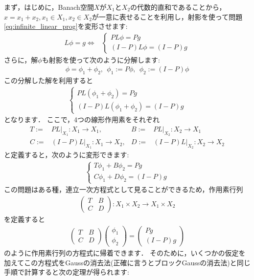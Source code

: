 まず，はじめに，Banach空間$X$が$X_1$と$X_2$の代数的直和であることから，$x = x_1 + x_2, x_1 \in X_1, x_2 \in X_2$が一意に表せることを利用し，射影を使って問題\eqref{eq:infinite_linear_prog}を変形させます:
\begin{align*}
	L \phi = g \Leftrightarrow& \left\{ \begin{array}{l}
		P L \phi = Pg \\
		(I - P) L \phi = (I - P) g
	\end{array}\right.
\end{align*}
さらに，解$\phi$も射影を使って次のように分解します:
\begin{align*}
	\phi = \phi_1 + \phi_2, ~~ \phi_1 := P \phi, ~~ \phi_2 := (I-P) \phi
\end{align*}
この分解した解を利用すると
\begin{align*}
\left\{ \begin{array}{l}
		P L ( \phi_1 + \phi_2 ) = Pg \\
		(I - P) L ( \phi_1 + \phi_2 ) = (I - P) g
	\end{array}\right.
\end{align*}
となります．
ここで，4つの線形作用素をそれぞれ
\begin{align}
	T :=& PL|_{X_1} : X_1 \rightarrow X_1, & B :=& PL|_{X_2}: X_2 \rightarrow X_1 \label{def:TBCD} \\
	C :=& (I - P) L |_{X_1}: X_1 \rightarrow X_2, & D :=& (I - P) L |_{X_2}: X_2 \rightarrow X_2 \nonumber
\end{align}
と定義すると，次のように変形できます:
\begin{align*}
\left\{ \begin{array}{l}
		T \phi_1 + B \phi_2 = Pg \\
		C \phi_1 + D \phi_2 = (I - P) g
	\end{array}\right.
\end{align*}
この問題はある種，連立一次方程式として見ることができるため，作用素行列
\begin{align*}
	\left( \begin{array}{cc}
		T & B \\
		C & D
	\end{array} \right) : X_1 \times X_2 \rightarrow X_1 \times X_2
\end{align*}
を定義すると
\begin{align*}
	\left( \begin{array}{cc}
		T & B \\
		C & D
	\end{array} \right)\left( \begin{array}{c}
		\phi_1 \\
		\phi_2
	\end{array} \right) = \left( \begin{array}{c}
		Pg \\
		(I-P)g
	\end{array} \right)
\end{align*}
のように作用素行列の方程式に帰着できます．
そのために，いくつかの仮定を加えてこの方程式をGaussの消去法(正確に言うとブロックGaussの消去法)と同じ手順で計算すると次の定理が得られます:

